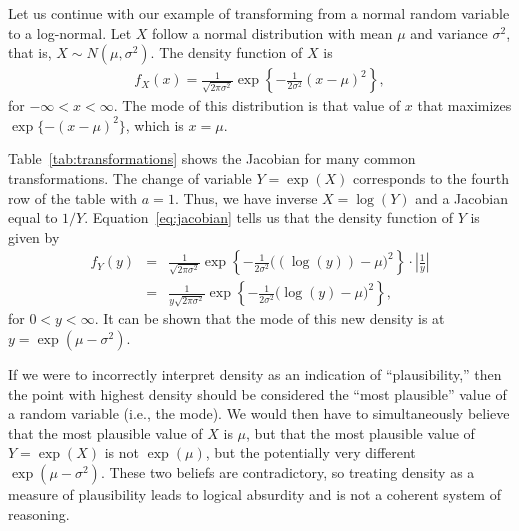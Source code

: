 \documentclass[9pt,twocolumn,twoside]{cidlab-draft}\templatetype{cidlab-invited}
\newcommand{\ora}[1]{{#1}}
\newcommand{\blu}[1]{{#1}}
\begin{document}
Let us continue with our example of transforming from a normal random variable to a log-normal. Let $X$ follow a normal distribution with mean $\mu$ and variance $\sigma^2$, that is, $X\sim N(\mu,\sigma^2)$. The density function of $X$ is 
\begin{eqnarray*}
f_X(x) = \frac{1}{\sqrt{2\pi\sigma^2}}\exp\left\{-\frac{1}{2\sigma^2}(x-\mu)^2\right\},
\end{eqnarray*}
for $-\infty < x < \infty$. The mode of this distribution is that value of $x$ that maximizes $\exp\{-(x-\mu)^2\}$, which is $x=\mu$.  

Table~\ref{tab:transformations} shows the Jacobian for many common transformations. The change of variable $Y=\exp(X)$ corresponds to the fourth row of the table with $a=1$. Thus, we have inverse $X=\log(Y)$ and a Jacobian equal to $1/Y$. Equation~\ref{eq:jacobian} tells us that the density function of $Y$ is given by
\begin{eqnarray*}
f_Y(y) &=&  \frac{1}{\sqrt{2\pi\sigma^2}}\exp\left\{-\frac{1}{2\sigma^2}\Big(\left(\ora{\log(y)}\right)-\mu\Big)^2\right\}\cdot\left|\blu{\frac{1}{y}}\right|\\
&=& \frac{1}{\blu{y}\sqrt{2\pi\sigma^2}}\exp\left\{-\frac{1}{2\sigma^2}\Big(\ora{\log(y)}-\mu\Big)^2\right\},
\end{eqnarray*}
for $0<y<\infty$. It can be shown that the mode of this new density is at $y=\exp{(\mu-\sigma^2)}$. 

If we were to incorrectly interpret density as an indication of ``plausibility,'' then the point with highest density should be considered the ``most plausible'' value of a random variable (i.e., the mode). We would then have to simultaneously believe that the most plausible value of $X$ is $\mu$, but that the most plausible value of $Y=\exp{(X)}$ is not $\exp{(\mu)}$, but the potentially very different $\exp{(\mu-\sigma^2)}$. These two beliefs are contradictory, so treating density as a measure of plausibility leads to logical absurdity and is not a coherent system of reasoning.
\end{document}
